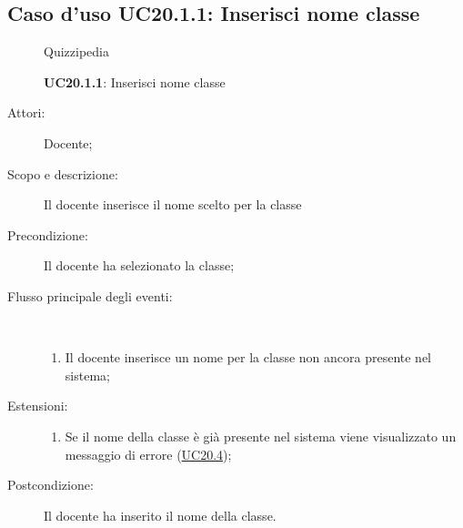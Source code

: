 \subsection{Caso d'uso UC20.1.1: Inserisci nome classe}
	\begin{figure}[H]
		\centering
		\begin{resizedtikzpicture}{\textwidth}
		\begin{umlsystem}[x=0, fill=lightgray!20]{Quizzipedia}
		\end{umlsystem}
		\end{resizedtikzpicture}
		\caption{\textbf{UC20.1.1}: Inserisci nome classe}
		\label{UC20.1.1}
	\end{figure}
\begin{description}
\item[Attori:] Docente;
\item[Scopo e descrizione:] Il docente inserisce il nome scelto per la classe
      \item[Precondizione:] Il docente ha selezionato la classe;

        \item[Flusso principale degli eventi:] \ 
 \begin{enumerate}
          \item Il docente inserisce un nome per la classe non ancora presente nel sistema;

      \end{enumerate}
    \item[Estensioni:]
      \begin{enumerate}
          \item Se il nome della classe è già presente nel sistema viene visualizzato un messaggio di errore (\hyperlink{UC20.4}{UC20.4});

      \end{enumerate}
    \item[Postcondizione:] Il docente ha inserito il nome della classe.
  \end{description}
\hypertarget{UC20.1.2}{}
